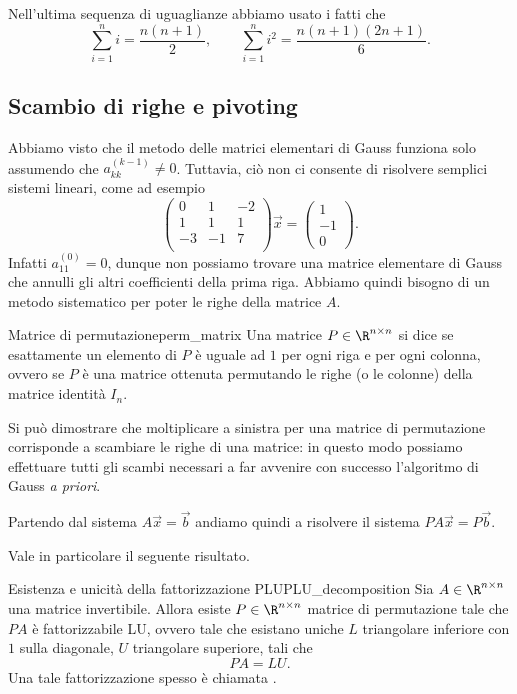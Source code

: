 \begin{remark}
    Nell'ultima sequenza di uguaglianze abbiamo usato i fatti che \[
        \sum_{i=1}^n i = \frac{n(n+1)}{2}, \qquad \sum_{i=1}^n i^2 = \frac{n(n+1)(2n+1)}{6}.
    \]
\end{remark}

\subsection{Scambio di righe e pivoting}

Abbiamo visto che il metodo delle matrici elementari di Gauss funziona solo assumendo che $a_{kk}^{(k-1)} \neq 0$. Tuttavia, ciò non ci consente di risolvere semplici sistemi lineari, come ad esempio \[
    \begin{pmatrix}
        0 & 1 &-2\\
        1 & 1 & 1\\
        -3 & -1 &7\\
    \end{pmatrix}\vec x = \begin{pmatrix}
        1 \\ -1 \\ 0
    \end{pmatrix}.
\] Infatti $a_{11}^{(0)} = 0$, dunque non possiamo trovare una matrice elementare di Gauss che annulli gli altri coefficienti della prima riga. Abbiamo quindi bisogno di un metodo sistematico per poter  le righe della matrice $A$.

\begin{definition}
    {Matrice di permutazione}{perm_matrix}
    Una matrice $P \in \Mat{\R, n, n}$ si dice  se esattamente un elemento di $P$ è uguale ad $1$ per ogni riga e per ogni colonna, ovvero se $P$ è una matrice ottenuta permutando le righe (o le colonne) della matrice identità $I_n$.   
\end{definition}

Si può dimostrare che moltiplicare a sinistra per una matrice di permutazione corrisponde a scambiare le righe di una matrice: in questo modo possiamo effettuare tutti gli scambi necessari a far avvenire con successo l'algoritmo di Gauss \emph{a priori}.

Partendo dal sistema $A\vec x = \vec b$ andiamo quindi a risolvere il sistema $PA\vec x = P\vec b$.

Vale in particolare il seguente risultato.
\begin{proposition}
    {Esistenza e unicità della fattorizzazione PLU}{PLU_decomposition}
    Sia $A \in \Mat{\R, n, n}$ una matrice invertibile. Allora esiste $P \in \Mat{\R, n, n}$ matrice di permutazione tale che $PA$ è fattorizzabile LU, ovvero tale che esistano uniche $L$ triangolare inferiore con $1$ sulla diagonale, $U$ triangolare superiore, tali che \[
        PA = LU.
    \]  
    Una tale fattorizzazione spesso è chiamata . 
\end{proposition}

